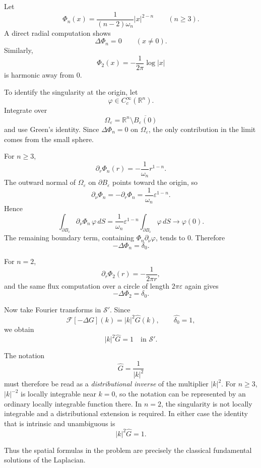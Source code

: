 \begin{solution}
Let
\[
\Phi_n(x)
=
\frac1{(n-2)\omega_n}|x|^{2-n}
\qquad(n\ge3).
\]
A direct radial computation shows
\[
\Delta\Phi_n=0
\qquad(x\ne0).
\]
Similarly,
\[
\Phi_2(x)
=
-\frac1{2\pi}\log|x|
\]
is harmonic away from \(0\).

To identify the singularity at the origin, let
\[
\varphi\in C_c^\infty(\mathbb R^n).
\]
Integrate over
\[
\Omega_\varepsilon
=
\mathbb R^n\setminus\overline{B_\varepsilon(0)}
\]
and use Green's identity. Since \(\Delta\Phi_n=0\) on
\(\Omega_\varepsilon\), the only contribution in the limit comes from the
small sphere.

For \(n\ge3\),
\[
\partial_r\Phi_n(r)
=
-\frac1{\omega_n}r^{1-n}.
\]
The outward normal of \(\Omega_\varepsilon\) on
\(\partial B_\varepsilon\) points toward the origin, so
\[
\partial_\nu\Phi_n
=
-\partial_r\Phi_n
=
\frac1{\omega_n}\varepsilon^{1-n}.
\]
Hence
\[
\int_{\partial B_\varepsilon}
\partial_\nu\Phi_n\,\varphi\,dS
=
\frac1{\omega_n}\varepsilon^{1-n}
\int_{\partial B_\varepsilon}\varphi\,dS
\longrightarrow
\varphi(0).
\]
The remaining boundary term, containing \(\Phi_n\partial_\nu\varphi\),
tends to \(0\). Therefore
\[
\boxed{-\Delta\Phi_n=\delta_0.}
\]

For \(n=2\),
\[
\partial_r\Phi_2(r)
=
-\frac1{2\pi r},
\]
and the same flux computation over a circle of length \(2\pi\varepsilon\)
again gives
\[
\boxed{-\Delta\Phi_2=\delta_0.}
\]

Now take Fourier transforms in \(\mathcal S'\). Since
\[
\mathcal F[-\Delta G](k)
=
|k|^2\widehat G(k),
\qquad
\widehat{\delta_0}=1,
\]
we obtain
\[
\boxed{
|k|^2\widehat G=1
\quad\text{in }\mathcal S'.}
\]

The notation
\[
\widehat G=\frac1{|k|^2}
\]
must therefore be read as a \emph{distributional inverse} of the multiplier
\(|k|^2\). For \(n\ge3\), \(|k|^{-2}\) is locally integrable near
\(k=0\), so the notation can be represented by an ordinary locally
integrable function there. In \(n=2\), the singularity is not locally
integrable and a distributional extension is required. In either case the
identity that is intrinsic and unambiguous is
\[
|k|^2\widehat G=1.
\]

Thus the spatial formulas in the problem are precisely the classical
fundamental solutions of the Laplacian.
\end{solution}

